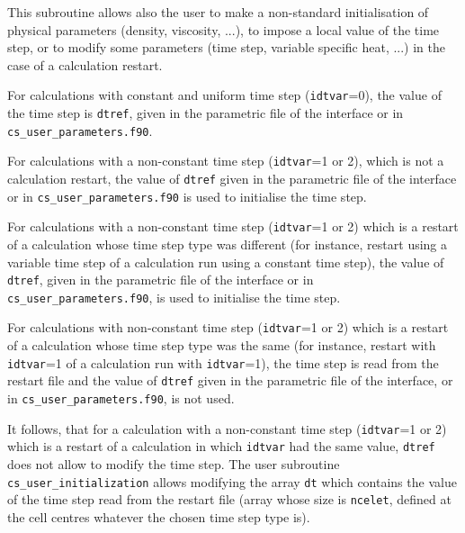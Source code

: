{{{This subroutine allows also the user to make a non-standard initialisation of
physical parameters (density, viscosity, ...), to impose a local
value of the time step, or to modify some parameters (time step,
variable specific heat, ...) in the case of a calculation restart.

\begin{list}{-}{}
\item For calculations with constant and uniform time step
      (\texttt{idtvar}=0), the value of the time step is \texttt{dtref},
      given in the parametric file of the interface or in
      \texttt{cs\_user\_parameters.f90}.
\item For calculations with a non-constant time step
      (\texttt{idtvar}=1 or 2), which is not a calculation restart,
      the value of \texttt{dtref} given in the parametric file of the interface
      or in \texttt{cs\_user\_parameters.f90} is used to initialise the time
      step.
\item For calculations with a non-constant time step
      (\texttt{idtvar}=1 or 2) which is a restart of a
      calculation whose time step type was different (for instance, restart
      using a variable time step of a calculation run using a constant time
      step), the value of \texttt{dtref}, given in the parametric file of the
      interface or in \texttt{cs\_user\_parameters.f90}, is used to initialise
      the time step.
\item For calculations with non-constant time step
      (\texttt{idtvar}=1 or 2) which is a restart of a
      calculation whose time step type was the same (for instance, restart with
      \texttt{idtvar}=1 of a calculation run with \texttt{idtvar}=1), the time
      step is read from the restart file and the value of \texttt{dtref} given
      in the parametric file of the interface, or in
      \texttt{cs\_user\_parameters.f90}, is not used.
\end{list}
It follows, that for a calculation with a non-constant time step
(\texttt{idtvar}=1 or 2) which is a restart of a calculation in which
\texttt{idtvar} had the same value, \texttt{dtref} does not allow to modify the
time step. The user subroutine \texttt{cs\_user\_initialization} allows
modifying the array \texttt{dt} which contains the value of the time step read
from the restart file (array whose size is \texttt{ncelet}, defined at the cell
centres whatever the chosen time step type is).

\clearpage

}}}
